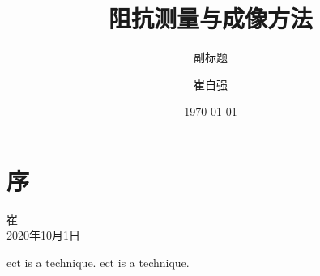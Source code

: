 \documentclass[cn,12pt,color=heda,chinesefont=win10,margintrue,toc=twocol,twoside,display,chinese]{etbook}
\title{阻抗测量与成像方法}
\subtitle{副标题}
\author{崔自强}
\institute{天津大学自动化学院}
\date{\today}
\begin{document}
\maketitle
\frontmatter

\chapter*{序}




\vskip 1.5cm

\begin{flushright}
崔\\
2020年10月1日
\end{flushright}

\tableofcontents

\mainmatter

% 




\cite{Dashliborun2019a}


\gls{ect} is a technique. 
\gls{ect} is a technique. 

\glsaddall

\setlength{\glsdescwidth}{0.5\linewidth}
\setlength{\glspagelistwidth}{0.1\linewidth}



\printnoidxglossary[type=acronym,sort=letter]
\printnoidxglossary[type=symbols,sort=letter]



\end{document}
